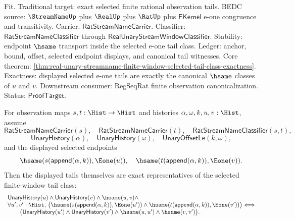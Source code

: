 Fit. Traditional target: exact selected finite rational observation tails. BEDC
source: $\StreamNameUp$ plus $\RealUp$ plus $\RatUp$ plus $\mathsf{FKernel}$
e-one congruence and transitivity. Carrier:
$\mathsf{RatStreamNameCarrier}$. Classifier:
$\mathsf{RatStreamNameClassifier}$ through
$\mathsf{RealUnaryStreamWindowClassifier}$. Stability: endpoint $\hsame$
transport inside the selected e-one tail class. Ledger: anchor, bound, offset,
selected endpoint displays, and canonical tail witnesses. Core theorem:
\autoref{thm:real-unary-streamname-finite-window-selected-tail-class-exactness}.
Exactness: displayed selected e-one tails are exactly the canonical $\hsame$
classes of $u$ and $v$. Downstream consumer: RegSeqRat finite observation
canonicalization. Status: $\mathsf{ProofTarget}$.

\begin{theorem}
\label{thm:real-unary-streamname-finite-window-displayed-selected-tail-class-exactness}
For observation maps $s,t:\Hist\to\Hist$ and histories
$\alpha,\omega,k,u,v:\Hist$, assume
$$
\mathsf{RatStreamNameCarrier}(s),\quad
\mathsf{RatStreamNameCarrier}(t),\quad
\mathsf{RatStreamNameClassifier}(s,t),
$$
$$
\mathsf{UnaryHistory}(\alpha),\quad
\mathsf{UnaryHistory}(\omega),\quad
\mathsf{UnaryOffsetLe}(k,\omega),
$$
and the displayed selected endpoints
$$
\hsame(s(\mathsf{append}(\alpha,k)),\Eone(u)),
\quad
\hsame(t(\mathsf{append}(\alpha,k)),\Eone(v)).
$$
Then the displayed tails themselves are exact representatives of the selected
finite-window tail class:
$$
\begin{array}{l}
\mathsf{UnaryHistory}(u)\land
\mathsf{UnaryHistory}(v)\land
\hsame(u,v)\land\\
\forall u',v':\Hist,\,
\bigl(\hsame(s(\mathsf{append}(\alpha,k)),\Eone(u'))\land
\hsame(t(\mathsf{append}(\alpha,k)),\Eone(v'))\bigr)
\Longleftrightarrow\\
\qquad
\bigl(\mathsf{UnaryHistory}(u')\land
\mathsf{UnaryHistory}(v')\land
\hsame(u,u')\land
\hsame(v,v')\bigr).
\end{array}
$$
\end{theorem}
